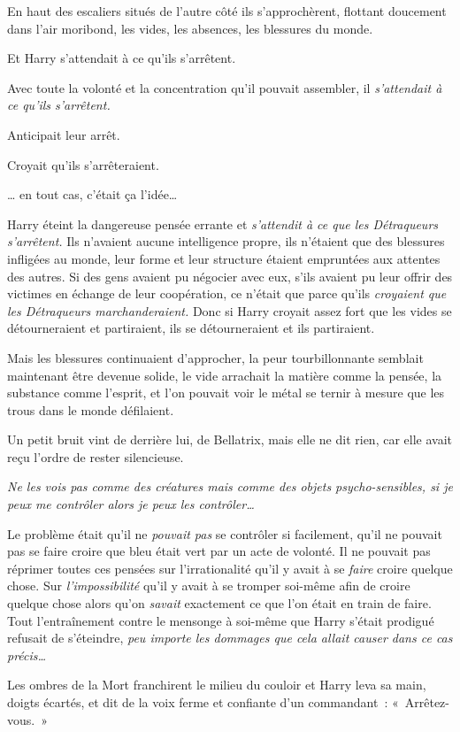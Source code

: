 En haut des escaliers situés de l'autre côté ils s'approchèrent, flottant doucement dans l'air moribond, les vides, les absences, les blessures du monde.

Et Harry s'attendait à ce qu'ils s'arrêtent.

Avec toute la volonté et la concentration qu'il pouvait assembler, il \emph{s'attendait à ce qu'ils s'arrêtent.}

Anticipait leur arrêt.

Croyait qu'ils s'arrêteraient.

… en tout cas, c'était ça l'idée…

Harry éteint la dangereuse pensée errante et \emph{s'attendit à ce que les Détraqueurs s'arrêtent.} Ils n'avaient aucune intelligence propre, ils n'étaient que des blessures infligées au monde, leur forme et leur structure étaient empruntées aux attentes des autres. Si des gens avaient pu négocier avec eux, s'ils avaient pu leur offrir des victimes en échange de leur coopération, ce n'était que parce qu'ils \emph{croyaient que les Détraqueurs marchanderaient.} Donc si Harry croyait assez fort que les vides se détourneraient et partiraient, ils se détourneraient et ils partiraient.

Mais les blessures continuaient d'approcher, la peur tourbillonnante semblait maintenant être devenue solide, le vide arrachait la matière comme la pensée, la substance comme l'esprit, et l'on pouvait voir le métal se ternir à mesure que les trous dans le monde défilaient.

Un petit bruit vint de derrière lui, de Bellatrix, mais elle ne dit rien, car elle avait reçu l'ordre de rester silencieuse.

\emph{Ne les vois pas comme des créatures mais comme des objets psycho-sensibles, si je peux me contrôler alors je peux les contrôler…}

Le problème était qu'il ne \emph{pouvait pas} se contrôler si facilement, qu'il ne pouvait pas se faire croire que bleu était vert par un acte de volonté. Il ne pouvait pas réprimer toutes ces pensées sur l'irrationalité qu'il y avait à se \emph{faire} croire quelque chose. Sur \emph{l'impossibilité} qu'il y avait à se tromper soi-même afin de croire quelque chose alors qu'on \emph{savait} exactement ce que l'on était en train de faire. Tout l'entraînement contre le mensonge à soi-même que Harry s'était prodigué refusait de s'éteindre, \emph{peu importe les dommages que cela allait causer dans ce cas précis…}

Les ombres de la Mort franchirent le milieu du couloir et Harry leva sa main, doigts écartés, et dit de la voix ferme et confiante d'un commandant~: «~Arrêtez-vous.~»

